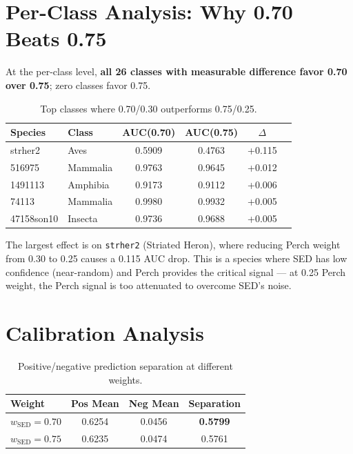 \documentclass[a4paper,11pt]{article}
\begin{document}
\section{Per-Class Analysis: Why 0.70 Beats 0.75}

At the per-class level, \textbf{all 26 classes with measurable difference favor 0.70 over 0.75}; zero classes favor 0.75.

\begin{table}[h]
\centering
\caption{Top classes where 0.70/0.30 outperforms 0.75/0.25.}
\small
\begin{tabular}{llcccc}
\toprule
Species & Class & AUC(0.70) & AUC(0.75) & $\Delta$ \\
\midrule
strher2 & Aves & 0.5909 & 0.4763 & +0.115 \\
516975 & Mammalia & 0.9763 & 0.9645 & +0.012 \\
1491113 & Amphibia & 0.9173 & 0.9112 & +0.006 \\
74113 & Mammalia & 0.9980 & 0.9932 & +0.005 \\
47158son10 & Insecta & 0.9736 & 0.9688 & +0.005 \\
\bottomrule
\end{tabular}
\label{tab:perclass}
\end{table}

The largest effect is on \texttt{strher2} (Striated Heron), where reducing Perch weight from 0.30 to 0.25 causes a 0.115 AUC drop.
This is a species where SED has low confidence (near-random) and Perch provides the critical signal ---
at 0.25 Perch weight, the Perch signal is too attenuated to overcome SED's noise.

\section{Calibration Analysis}

\begin{table}[h]
\centering
\caption{Positive/negative prediction separation at different weights.}
\begin{tabular}{lccc}
\toprule
Weight & Pos Mean & Neg Mean & Separation \\
\midrule
$w_\text{SED}=0.70$ & 0.6254 & 0.0456 & \textbf{0.5799} \\
$w_\text{SED}=0.75$ & 0.6235 & 0.0474 & 0.5761 \\
\bottomrule
\end{tabular}
\label{tab:calibration}
\end{table}
\end{document}
